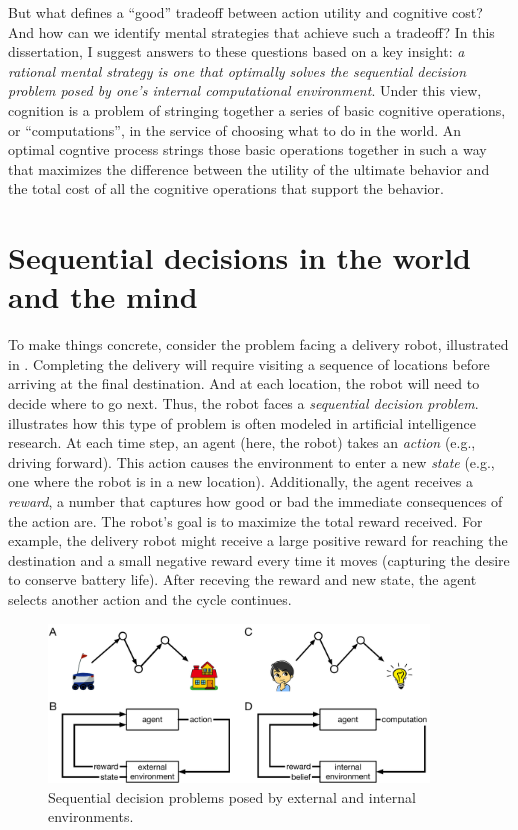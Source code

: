 But what defines a ``good'' tradeoff between action utility and cognitive cost? And how can we identify mental strategies that achieve such a tradeoff? In this dissertation, I suggest answers to these questions based on a key insight: \emph{a rational mental strategy is one that optimally solves the sequential decision problem posed by one's internal computational environment}. Under this view, cognition is a problem of stringing together a series of basic cognitive operations, or ``computations'', in the service of choosing what to do in the world. An optimal cogntive process strings those basic operations together in such a way that maximizes the difference between the utility of the ultimate behavior and the total cost of all the cognitive operations that support the behavior.


\section{Sequential decisions in the world and the mind}

To make things concrete, consider the problem facing a delivery robot, illustrated in . Completing the delivery will require visiting a sequence of locations before arriving at the final destination. And at each location, the robot will need to decide where to go next. Thus, the robot faces a \emph{sequential decision problem}.  illustrates how this type of problem is often modeled in artificial intelligence research. At each time step, an agent (here, the robot) takes an \emph{action} (e.g., driving forward). This action causes the environment to enter a new \emph{state} (e.g., one where the robot is in a new location). Additionally, the agent receives a \emph{reward}, a number that captures how good or bad the immediate consequences of the action are. The robot's goal is to maximize the total reward received. For example, the delivery robot might receive a large positive reward for reaching the destination and a small negative reward every time it moves (capturing the desire to conserve battery life). After receving the reward and new state, the agent selects another action and the cycle continues.

\begin{figure}[tb]
  \centering
  \includegraphics[width=0.9\textwidth]{diagrams/sequential-intuition.pdf}
  \caption{Sequential decision problems posed by external and internal environments.}
  \label{fig:sequential-intuition}
\end{figure}

